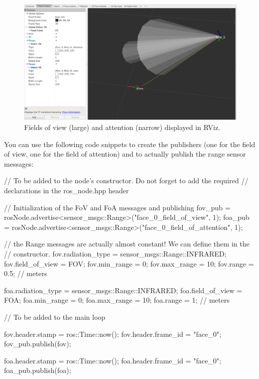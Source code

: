 \documentclass{instructions}
\begin{document}
\begin{figure}
    \centering
    \includegraphics[width=0.9\linewidth]{figs/fov}
    \caption{Fields of view (large) and attention (narrow) displayed in RViz.}
    \label{fov}
\end{figure}

You can use the following code snippets to create the publishers (one for the
field of view, one for the field of attention) and to actually publish the range
sensor messages:

\begin{cppcode}
// To be added to the node's constructor. Do not forget to add the required
// declarations in the ros_node.hpp header

// Initialization of the FoV and FoA messages and publishing
fov_pub = rosNode.advertise<sensor_msgs::Range>("face_0_field_of_view", 1);
foa_pub = rosNode.advertise<sensor_msgs::Range>("face_0_field_of_attention", 1);

// the Range messages are actually almost constant! We can define them in the
// constructor.
fov.radiation_type = sensor_msgs::Range::INFRARED;
fov.field_of_view = FOV;
fov.min_range = 0;
fov.max_range = 10;
fov.range = 0.5; // meters

foa.radiation_type = sensor_msgs::Range::INFRARED;
foa.field_of_view = FOA;
foa.min_range = 0;
foa.max_range = 10;
foa.range = 1; // meters
\end{cppcode}

\begin{cppcode}
// To be added to the main loop

fov.header.stamp = ros::Time::now();
fov.header.frame_id = "face_0";
fov_pub.publish(fov); 

foa.header.stamp = ros::Time::now();
foa.header.frame_id = "face_0";
foa_pub.publish(foa); 
\end{cppcode}
\end{document}
